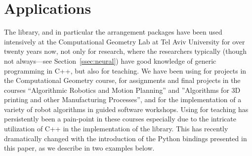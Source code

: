 \section{Applications}
\label{sec:app}
The \cgal{} library, and in particular the \cgal{} arrangement packages have been used intensively at the Computational Geometry Lab at Tel Aviv University for over twenty years now, not only for research, where the researchers typically
(though not always---see Section~\ref{ssec:neural})
have good knowledge of generic programming in C++, but also for teaching. We have been using
\cgal{} for projects in the Computational Geometry course, for assignments and final projects in the courses ``Algorithmic Robotics and Motion Planning'' and ''Algorithms for 3D printing and other Manufacturing Processes'', and for the implementation of a variety of robot algorithms in guided software workshops. Using \cgal{} for teaching  has persistently been a pain-point in these courses especially due to the intricate  utilization of C++ in the implementation of the library. This has recently dramatically changed with the introduction of the Python bindings presented in this paper,
as we describe in two examples below.

